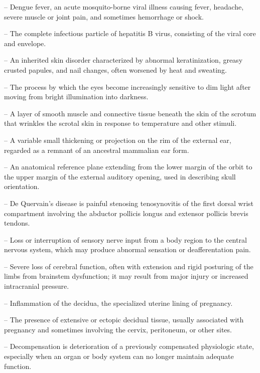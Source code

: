 -- Dengue fever, an acute mosquito-borne viral illness causing fever, headache, severe muscle or joint pain, and sometimes hemorrhage or shock.

-- The complete infectious particle of hepatitis B virus, consisting of the viral core and envelope.

-- An inherited skin disorder characterized by abnormal keratinization, greasy crusted papules, and nail changes, often worsened by heat and sweating.

-- The process by which the eyes become increasingly sensitive to dim light after moving from bright illumination into darkness.

-- A layer of smooth muscle and connective tissue beneath the skin of the scrotum that wrinkles the scrotal skin in response to temperature and other stimuli.

-- A variable small thickening or projection on the rim of the external ear, regarded as a remnant of an ancestral mammalian ear form.

-- An anatomical reference plane extending from the lower margin of the orbit to the upper margin of the external auditory opening, used in describing skull orientation.

-- De Quervain's disease is painful stenosing tenosynovitis of the first dorsal wrist compartment involving the abductor pollicis longus and extensor pollicis brevis tendons.

-- Loss or interruption of sensory nerve input from a body region to the central nervous system, which may produce abnormal sensation or deafferentation pain.

-- Severe loss of cerebral function, often with extension and rigid posturing of the limbs from brainstem dysfunction; it may result from major injury or increased intracranial pressure.

-- Inflammation of the decidua, the specialized uterine lining of pregnancy.

-- The presence of extensive or ectopic decidual tissue, usually associated with pregnancy and sometimes involving the cervix, peritoneum, or other sites.

-- Decompensation is deterioration of a previously compensated physiologic state, especially when an organ or body system can no longer maintain adequate function.

